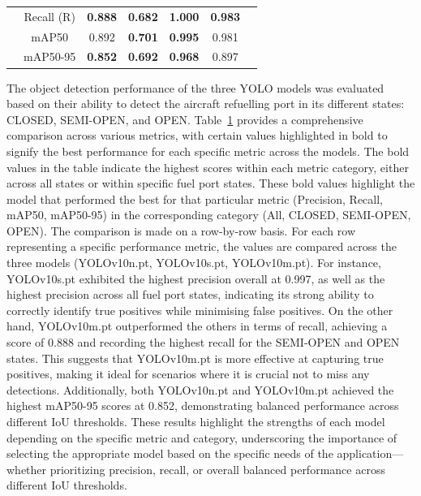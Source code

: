 \documentclass[12pt,oneside]{book} %
\begin{document}
\begin{table}[H]
\begin{adjustbox}{max width=\textwidth}
\begin{tabular}{lcccccc}
                                                  & Recall (R)      & \textbf{0.888} & \textbf{0.682}              & \textbf{1.000}                 & \textbf{0.983}            \\
                                                  & mAP50           & 0.892          & \textbf{0.701}              & \textbf{0.995}                 & 0.981                     \\
                                                  & mAP50-95        & \textbf{0.852} & \textbf{0.692}              & \textbf{0.968}                 & 0.897                     \\
            \bottomrule
        \end{tabular}
    \end{adjustbox}
    \label{tab:comparison}
\end{table}

\noindent The object detection performance of the three YOLO models was evaluated based
on their ability to detect the aircraft refuelling port in its different
states: CLOSED, SEMI-OPEN, and OPEN. Table~\ref{tab:comparison} provides a
comprehensive comparison across various metrics, with certain values
highlighted in bold to signify the best performance for each specific metric
across the models. The bold values in the table indicate the highest scores
within each metric category, either across all states or within specific fuel
port states. These bold values highlight the model that performed the best for
that particular metric (Precision, Recall, mAP50, mAP50-95) in the
corresponding category (All, CLOSED, SEMI-OPEN, OPEN). The comparison is made
on a row-by-row basis. For each row representing a specific performance metric,
the values are compared across the three models (YOLOv10n.pt, YOLOv10s.pt,
YOLOv10m.pt). For instance,
YOLOv10s.pt exhibited the highest precision overall at 0.997, as well as the
highest precision across all fuel port states, indicating its strong ability to
correctly identify true positives while minimising false positives. On the
other hand, YOLOv10m.pt outperformed the others in terms of recall, achieving a
score of 0.888 and recording the highest recall for the SEMI-OPEN and OPEN
states. This suggests that YOLOv10m.pt is more effective at capturing true
positives, making it ideal for scenarios where it is crucial not to miss any
detections. Additionally, both YOLOv10n.pt and YOLOv10m.pt achieved the highest
mAP50-95 scores at 0.852, demonstrating balanced performance across different
IoU thresholds. These results highlight the strengths of each model depending
on the specific metric and category, underscoring the importance of selecting
the appropriate model based on the specific needs of the application—whether
prioritizing precision, recall, or overall balanced performance across
different IoU thresholds.
\end{document}
